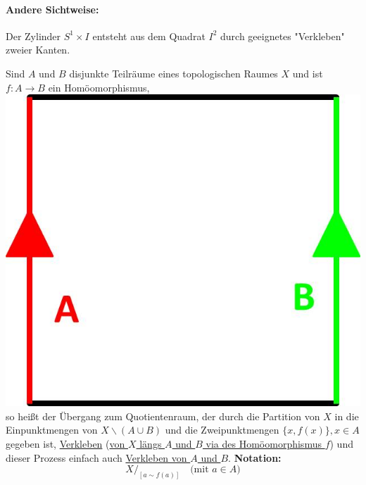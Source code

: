 \documentclass[a4paper,11pt,notitlepage]{report}
\theoremstyle{definition}
\newenvironment{definition}[1]{
	\begin{definitions}
	\marginnote{\emph{#1}}
}{\end{definitions}}
\begin{document}
\paragraph{Andere Sichtweise:}
Der Zylinder $S^1 \times I$ entsteht aus dem Quadrat $I^2$ durch geeignetes "Verkleben" zweier Kanten. 

\begin{definition}{Verkleben}
Sind $A$ und $B$ disjunkte Teilräume eines topologischen Raumes $X$ und ist $f \colon A \rightarrow B$ ein Homöomorphismus, \includegraphics[scale=0.2]{images/Def_Verkleben.jpg} so heißt der Übergang zum Quotientenraum, der durch die Partition von $X$ in die Einpunktmengen von $X \backslash (A \cup B)$ und die Zweipunktmengen $\{x,f(x)\}, x \in A$ gegeben ist, \underline{Verkleben} (\underline{von $X$ längs $A$ und $B$ via des Homöomorphismus $f$}) und dieser Prozess einfach auch \underline{Verkleben von $A$ und $B$}.
\newline
\textbf{Notation:}
$$X/_{[a \sim f(a)]} \quad \text{(mit $a \in A$)}$$
\end{definition}
\end{document}
